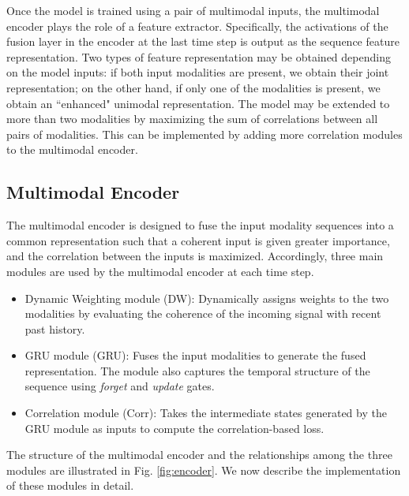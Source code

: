 \documentclass[10pt,twocolumn,letterpaper]{article}
\begin{document}
Once the model is trained using a pair of multimodal inputs, the multimodal encoder plays the role of a feature extractor. Specifically, the activations of the fusion layer in the encoder at the last time step is output as the sequence feature representation. Two types of feature representation may be obtained depending on the model inputs: if both input modalities are present, we obtain their joint representation; on the other hand, if only one of the modalities is present, we obtain an ``enhanced" unimodal representation. The model may be extended to more than two modalities by maximizing the sum of correlations between all pairs of modalities. This can be implemented by adding more correlation modules to the multimodal encoder.


\subsection{Multimodal Encoder}
\label{sec:encoder}

The multimodal encoder is designed to fuse the input modality sequences into a common representation such that a coherent input is given greater importance, and the correlation between the inputs is maximized. Accordingly, three main modules are used by the multimodal encoder at each time step.

\begin{itemize}
	\item Dynamic Weighting module (DW): Dynamically assigns weights to the two modalities by evaluating the coherence of the incoming signal with recent past history. %
    \item GRU module (GRU): Fuses the input modalities to generate the fused representation. The module also captures the temporal structure of the sequence using \textit{forget} and \textit{update} gates.   
	\item Correlation module (Corr): Takes the intermediate states generated by the GRU module as inputs to compute the correlation-based loss. %
\end{itemize}

The structure of the multimodal encoder and the relationships among the three modules are illustrated in Fig. \ref{fig:encoder}. We now describe the implementation of these modules in detail.
\end{document}

